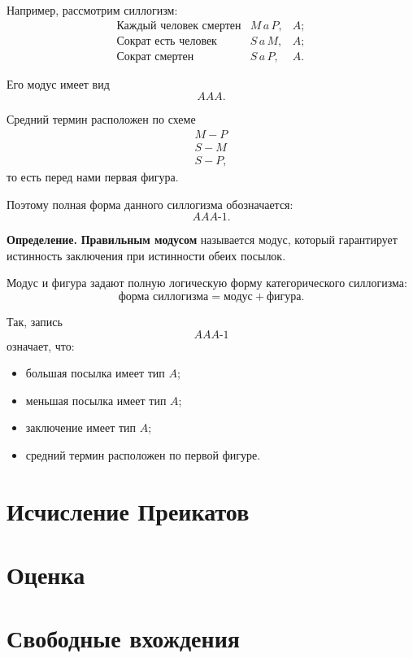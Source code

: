 \documentclass[12pt,a4paper,oneside,openany]{book}
\theoremstyle{definition}
\theoremstyle{plain}
\theoremstyle{remark}
\begin{document}
Например, рассмотрим силлогизм:
\[
\begin{array}{lll}
\text{Каждый человек смертен}
&
M\,a\,P,
&
A;
\\
\text{Сократ есть человек}
&
S\,a\,M,
&
A;
\\
\hline
\text{Сократ смертен}
&
S\,a\,P,
&
A.
\end{array}
\]

Его модус имеет вид
\[
AAA.
\]

Средний термин расположен по схеме
\[
\begin{array}{c}
M-P\\
S-M\\
\hline
S-P,
\end{array}
\]
то есть перед нами первая фигура.

Поэтому полная форма данного силлогизма обозначается:
\[
AAA\text{-}1.
\]

\textbf{Определение.}
\textbf{Правильным модусом} называется модус, который гарантирует
истинность заключения при истинности обеих посылок.

Модус и фигура задают полную логическую форму категорического
силлогизма:
\[
\boxed{
\text{форма силлогизма}
=
\text{модус}
+
\text{фигура}.
}
\]

Так, запись
\[
AAA\text{-}1
\]
означает, что:

\begin{itemize}
    \item большая посылка имеет тип \(A\);
    \item меньшая посылка имеет тип \(A\);
    \item заключение имеет тип \(A\);
    \item средний термин расположен по первой фигуре.
\end{itemize}\section{Исчисление Преикатов}














\section{Оценка}
\section{Свободные вхождения}
\end{document}
